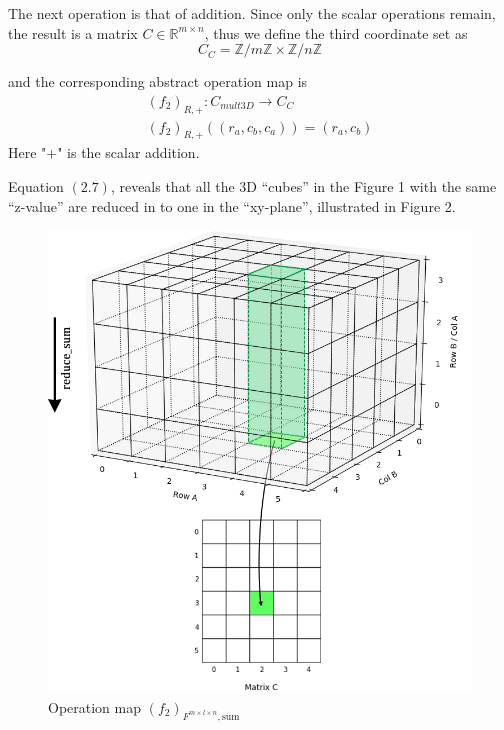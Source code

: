 \documentclass{amsart}
\theoremstyle{definition}
\theoremstyle{remark}
\numberwithin{equation}{section}
\begin{document}
\par
The next operation is that of addition. Since only the scalar operations remain, the result is a matrix  $C\in \mathbb{R}^{m\times n}$, thus we define the third coordinate set as
\begin{equation}
C_C=\mathbb{Z}/{m\mathbb{Z}}\times \mathbb{Z}/{n\mathbb{Z}}
\end{equation}\par
and the corresponding abstract operation map is 
\begin{equation}
\begin{array}{l}  
             (f_2)_{R,+}:C_{mult3D}\to C_C\\ 
             (f_2)_{R,+}((r_a,c_b,c_a))=(r_a,c_b)
\end{array}
\end{equation}
Here "+" is the scalar addition.

	
	Equation $(2.7)$, reveals that all the 3D “cubes” in the Figure 1 with the same “z-value” are reduced in to one in the “xy-plane”, illustrated in Figure 2. \par
\begin{figure}[h]
	\includegraphics[scale=0.45]{Figures/Matrix3d_Reduce.png}
	\caption{Operation map $(f_2)_{F^{m\times l\times n},\text{sum}}$}
\end{figure}
~\\
\par
\end{document}
